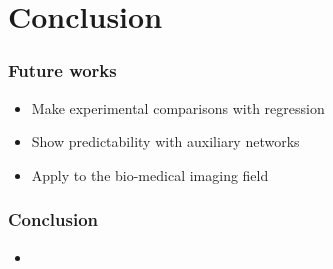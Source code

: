 \documentclass[10pt]{beamer}
\begin{document}
\section{Conclusion}
\begin{frame}
    \frametitle{Future works}
    \begin{itemize}
        \item Make experimental comparisons with regression
        \item Show predictability with auxiliary networks
        \item Apply to the bio-medical imaging field
    \end{itemize}
\end{frame}

\begin{frame}
    \frametitle{Conclusion}
    \begin{itemize}
        \item %
    \end{itemize}
\end{frame}
\end{document}
